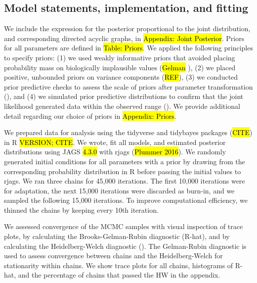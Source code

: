 \documentclass[12pt, oneside, titlepage]{article}   	%
\begin{document}
{\subsection{Model statements, implementation, and fitting}

We include the expression for the posterior proportional to the joint distribution, and corresponding directed acyclic graphs, in \hl{Appendix: Joint Posterior}. Priors for all parameters are defined in \hl{Table: Priors}. We applied the following principles to specify priors: (1) we used weakly informative priors that avoided placing probability mass on biologically implausible values (\hl{Gelman} \cite{lemoine2019,wesner2020}), (2) we placed positive, unbounded priors on variance components (\hl{REF}), (3) we conducted prior predictive checks to assess the scale of priors after parameter transformation (\cite{hobbs2015b,gabry2019,wesner2020}), and (4) we simulated prior predictive distributions to confirm that the joint likelihood generated data within the observed range (\cite{gabry2019,conn2018,hobbs2015b}). We provide additional detail regarding our choice of priors in \hl{Appendix: Priors}. 

We prepared data for analysis using the tidyverse and tidybayes packages (\hl{CITE}) in R \hl{VERSION; CITE}. We wrote, fit all models, and estimated posterior distributions using JAGS \hl{4.3.0} with rjags (\hl{Plummer 2016}). We randomly generated initial conditions for all parameters with a prior by drawing from the corresponding probability distribution in R before passing the initial values to rjags. We ran three chains for 45,000 iterations. The first 10,000 iterations were for adaptation, the next 15,000 iterations were discarded as burn-in, and we sampled the following 15,000 iterations. To improve computational efficiency, we thinned the chains by keeping every 10th iteration.

We assessed convergence of the MCMC samples with visual inspection of trace plots, by calculating the Brooks-Gelman-Rubin diagnostic (R-hat), and by calculating the Heidelberg-Welch diagnostic (\cite{elderd2015}). The Gelman-Rubin diagnostic is used to assess convergence between chains and the Heidelberg-Welch for stationarity within chains. We show trace plots for all chains, histograms of R-hat, and the percentage of chains that passed the HW in the appendix. 
 
}
\end{document}
